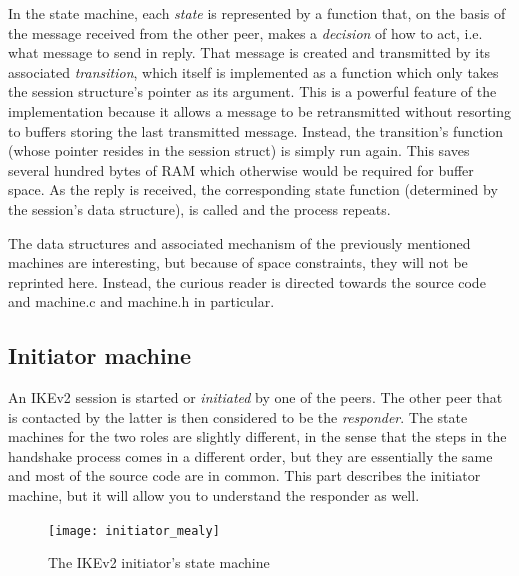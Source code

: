 \documentclass[final,a4paper,twoside,11pt,onecolumn]{report}
\begin{document}
In the state machine, each \emph{state} is represented by a function that, on the basis of the message received from the other peer, makes a \emph{decision} of how to act, i.e. what message to send in reply. That message is created and transmitted by its associated \emph{transition}, which itself is implemented as a function which only takes the session structure's pointer as its argument. This is a powerful feature of the implementation because it allows a message to be retransmitted without resorting to buffers storing the last transmitted message. Instead, the transition's function (whose pointer resides in the session struct) is simply run again. This saves several hundred bytes of RAM which otherwise would be required for buffer space. As the reply is received, the corresponding state function (determined by the session's data structure), is called and the process repeats.

The data structures and associated mechanism of the previously mentioned machines are interesting, but because of space constraints, they will not be reprinted here. Instead, the curious reader is directed towards the source code and machine.c and machine.h in particular.


\subsection{Initiator machine}

An IKEv2 session is started or \emph{initiated} by one of the peers. The other peer that is contacted by the latter is then considered to be the \emph{responder}. The state machines for the two roles are slightly different, in the sense that the steps in the handshake process comes in a different order, but they are essentially the same and most of the source code are in common. This part describes the initiator machine, but it will allow you to understand the responder as well.

\begin{figure}[h]
   \texttt{[image: initiator\_mealy]}
   \caption{The IKEv2 initiator's state machine}
   \label{fig:initiator-machine}
\end{figure}
\end{document}
